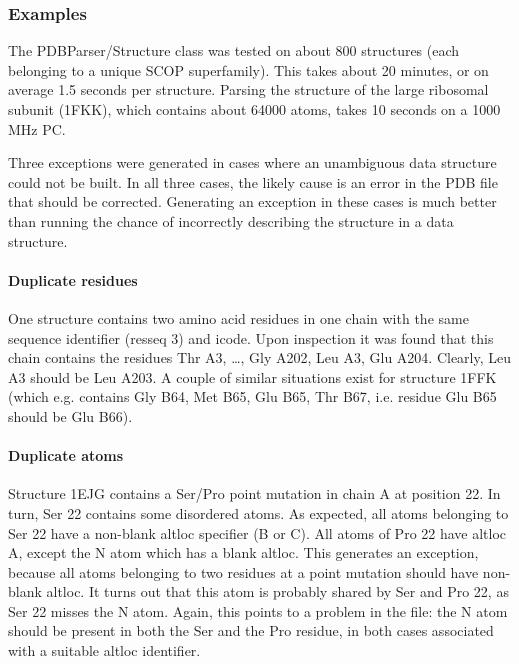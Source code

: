 \documentclass{report}
\begin{document}
\subsubsection{Examples\label{problem structures}}

The PDBParser/Structure class was tested on about 800 structures (each belonging
to a unique SCOP superfamily). This takes about 20 minutes, or on average 1.5
seconds per structure. Parsing the structure of the large ribosomal subunit
(1FKK), which contains about 64000 atoms, takes 10 seconds on a 1000 MHz PC.

Three exceptions were generated in cases where an unambiguous data structure
could not be built. In all three cases, the likely cause is an error in the
PDB file that should be corrected. Generating an exception in these cases
is much better than running the chance of incorrectly describing
the structure in a data structure.

\paragraph{Duplicate residues}

One structure contains two amino acid residues in one chain with the same sequence
identifier (resseq 3) and icode. Upon inspection it was found that this chain
contains the residues Thr A3, \ldots{}, Gly A202, Leu A3, Glu A204. Clearly,
Leu A3 should be Leu A203. A couple of similar situations exist for structure
1FFK (which e.g. contains Gly B64, Met B65, Glu B65, Thr B67, i.e. residue Glu
B65 should be Glu B66).

\paragraph{Duplicate atoms}

Structure 1EJG contains a Ser/Pro point mutation in chain A at position 22.
In turn, Ser 22 contains some disordered atoms. As expected, all atoms belonging
to Ser 22 have a non-blank altloc specifier (B or C). All atoms of Pro 22 have
altloc A, except the N atom which has a blank altloc. This generates an exception,
because all atoms belonging to two residues at a point mutation should have
non-blank altloc. It turns out that this atom is probably shared by Ser and
Pro 22, as Ser 22 misses the N atom. Again, this points to a problem in the
file: the N atom should be present in both the Ser and the Pro residue, in both
cases associated with a suitable altloc identifier.
\end{document}
